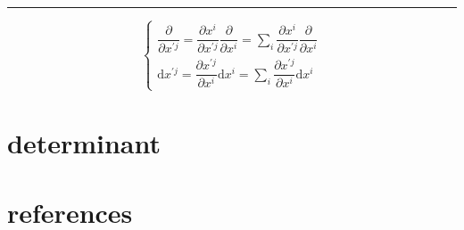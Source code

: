 \documentclass[
]{book}
\theoremstyle{definition}
\theoremstyle{definition}
\theoremstyle{definition}
\theoremstyle{definition}
\theoremstyle{remark}
\begin{document}
\begin{center}\rule{0.5\linewidth}{0.5pt}\end{center}

\[
\begin{cases}
\dfrac{\partial}{\partial x^{\prime{\scriptscriptstyle j}}}=\dfrac{\partial x^{{\scriptscriptstyle i}}}{\partial x^{\prime{\scriptscriptstyle j}}}\dfrac{\partial}{\partial x^{{\scriptscriptstyle i}}}=\sum\limits _{i}\dfrac{\partial x^{{\scriptscriptstyle i}}}{\partial x^{\prime{\scriptscriptstyle j}}}\dfrac{\partial}{\partial x^{{\scriptscriptstyle i}}}\\
\mathrm{d}x^{\prime{\scriptscriptstyle j}}=\dfrac{\partial x^{\prime{\scriptscriptstyle j}}}{\partial x^{{\scriptscriptstyle i}}}\mathrm{d}x^{{\scriptscriptstyle i}}=\sum\limits_{i}\dfrac{\partial x^{\prime{\scriptscriptstyle j}}}{\partial x^{{\scriptscriptstyle i}}}\mathrm{d}x^{{\scriptscriptstyle i}}
\end{cases}
\]

\hypertarget{determinant}{%
\chapter{determinant}\label{determinant}}

\hypertarget{references}{%
\chapter*{references}\label{references}}
\end{document}
